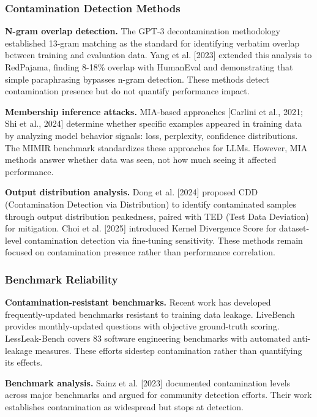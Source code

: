 
\subsubsection{Contamination Detection Methods}

\textbf{N-gram overlap detection.} The GPT-3 decontamination methodology \citep{brown2020language} established 13-gram matching as the standard for identifying verbatim overlap between training and evaluation data. Yang et al. [2023] extended this analysis to RedPajama, finding 8-18\% overlap with HumanEval and demonstrating that simple paraphrasing bypasses n-gram detection. These methods detect contamination presence but do not quantify performance impact.

\textbf{Membership inference attacks.} MIA-based approaches [Carlini et al., 2021; Shi et al., 2024] determine whether specific examples appeared in training data by analyzing model behavior signals: loss, perplexity, confidence distributions. The MIMIR benchmark \citep{duan2024mimir} standardizes these approaches for LLMs. However, MIA methods answer whether data was seen, not how much seeing it affected performance.

\textbf{Output distribution analysis.} Dong et al. [2024] proposed CDD (Contamination Detection via Distribution) to identify contaminated samples through output distribution peakedness, paired with TED (Test Data Deviation) for mitigation. Choi et al. [2025] introduced Kernel Divergence Score for dataset-level contamination detection via fine-tuning sensitivity. These methods remain focused on contamination presence rather than performance correlation.

\subsubsection{Benchmark Reliability}

\textbf{Contamination-resistant benchmarks.} Recent work has developed frequently-updated benchmarks resistant to training data leakage. LiveBench \citep{white2024livebench} provides monthly-updated questions with objective ground-truth scoring. LessLeak-Bench \citep{zhou2025lessleak} covers 83 software engineering benchmarks with automated anti-leakage measures. These efforts sidestep contamination rather than quantifying its effects.

\textbf{Benchmark analysis.} Sainz et al. [2023] documented contamination levels across major benchmarks and argued for community detection efforts. Their work establishes contamination as widespread but stops at detection.

